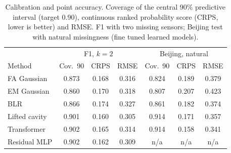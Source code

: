\begin{table}[t]
\centering\small
\caption{\label{tab:calib}Calibration and point accuracy. Coverage of the central 90\% predictive interval (target 0.90), continuous ranked probability score (CRPS, lower is better) and RMSE. F1 with two missing sensors; Beijing test with natural missingness (fine tuned learned models).}
\begin{tabular}{lcccccc}
\toprule
 & \multicolumn{3}{c}{F1, $k=2$} & \multicolumn{3}{c}{Beijing, natural}\\
Method & Cov.\ 90 & CRPS & RMSE & Cov.\ 90 & CRPS & RMSE\\
\midrule
FA Gaussian & 0.873 & 0.168 & 0.316 & 0.824 & 0.189 & 0.379\\
EM Gaussian & 0.860 & 0.170 & 0.318 & 0.807 & 0.207 & 0.423\\
BLR & 0.866 & 0.174 & 0.327 & 0.861 & 0.182 & 0.374\\
Lifted cavity & 0.901 & 0.160 & 0.305 & 0.914 & 0.171 & 0.357\\
Transformer & 0.902 & 0.165 & 0.314 & 0.914 & 0.158 & 0.341\\
Residual MLP & 0.902 & 0.162 & 0.309 & n/a & n/a & n/a\\
\bottomrule
\end{tabular}
\end{table}
